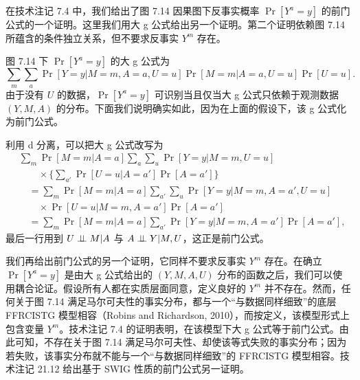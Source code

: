 \begin{techpoint}
在技术注记 7.4 中，我们给出了图 7.14 因果图下反事实概率 $\Pr[Y^a=y]$ 的前门公式的一个证明。这里我们用大 g 公式给出另一个证明。第二个证明依赖图 7.14 所蕴含的条件独立关系，但不要求反事实 $Y^m$ 存在。

图 7.14 下 $\Pr[Y^a=y]$ 的大 g 公式为
\[
\sum_m\sum_a\Pr[Y=y|M=m,A=a,U=u]\Pr[M=m|A=a,U=u]\Pr[U=u].
\]
由于没有 $U$ 的数据，$\Pr[Y^a=y]$ 可识别当且仅当大 g 公式只依赖于观测数据 $(Y,M,A)$ 的分布。下面我们说明确实如此，因为在上面的假设下，该 g 公式化为前门公式。

利用 d 分离，可以把大 g 公式改写为
\[
\begin{aligned}
&\sum_m\Pr[M=m|A=a]\sum_a\sum_u\Pr[Y=y|M=m,U=u]\\
&\qquad\times\Big\{\sum_{a'}\Pr[U=u|A=a']\Pr[A=a']\Big\}\\
&\quad=\sum_m\Pr[M=m|A=a]\sum_{a'}\sum_u\Pr[Y=y|M=m,A=a',U=u]\\
&\qquad\times\Pr[U=u|M=m,A=a']\Pr[A=a']\\
&\quad=\sum_m\Pr[M=m|A=a]\sum_{a'}\Pr[Y=y|M=m,A=a']\Pr[A=a'],
\end{aligned}
\]
最后一行用到 $U\perp\!\!\!\perp M|A$ 与 $A\perp\!\!\!\perp Y|M,U$，这正是前门公式。

我们再给出前门公式的另一个证明，它同样不要求反事实 $Y^m$ 存在。在确立 $\Pr[Y^a=y]$ 是由大 g 公式给出的 $(Y,M,A,U)$ 分布的函数之后，我们可以使用耦合论证。假设所有人都在实质层面同意，定义良好的 $Y^m$ 并不存在。然而，任何关于图 7.14 满足马尔可夫性的事实分布，都与一个“与数据同样细致”的底层 FFRCISTG 模型相容（Robins and Richardson, 2010），而按定义，该模型形式上包含变量 $Y^m$。技术注记 7.4 的证明表明，在该模型下大 g 公式等于前门公式。由此可知，不存在关于图 7.14 满足马尔可夫性、却使该等式失败的事实分布；因为若失败，该事实分布就不能与一个“与数据同样细致”的 FFRCISTG 模型相容。技术注记 21.12 给出基于 SWIG 性质的前门公式另一证明。
\end{techpoint}

